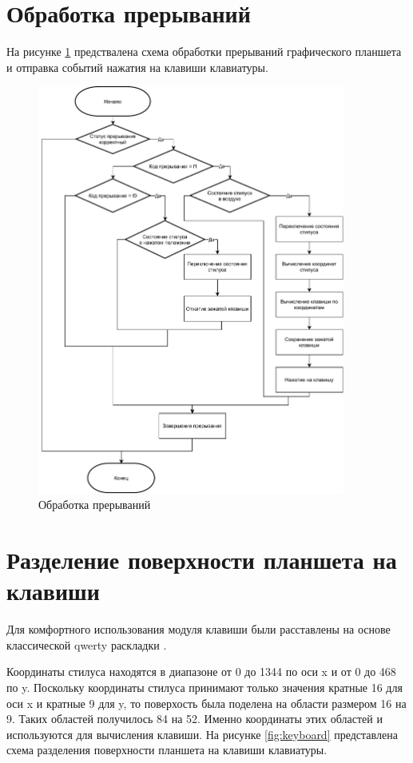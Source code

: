 \section{Обработка прерываний}

На рисунке \ref{fig:urb} предствалена схема обработки прерываний графического планшета и отправка событий нажатия на клавиши клавиатуры.

\begin{figure}[H]
    \centering
    \includegraphics[width=0.9\textwidth]{img/urb.pdf}
    \caption{Обработка прерываний}
    \label{fig:urb}
\end{figure}

\section{Разделение поверхности планшета на клавиши}

Для комфортного использования модуля клавиши были расставлены на основе классической qwerty раскладки \cite{Qwerty}.

Координаты стилуса находятся в диапазоне от 0 до 1344 по оси x и от 0 до 468 по y. Поскольку координаты стилуса принимают только значения кратные 16 для оси x и кратные 9 для y, то поверхость была поделена на области размером 16 на 9. Таких областей получилось 84 на 52. Именно координаты этих областей и используются для вычисления клавиши. На рисунке \ref{fig:keyboard} представлена схема разделения поверхности планшета на клавиши клавиатуры.

